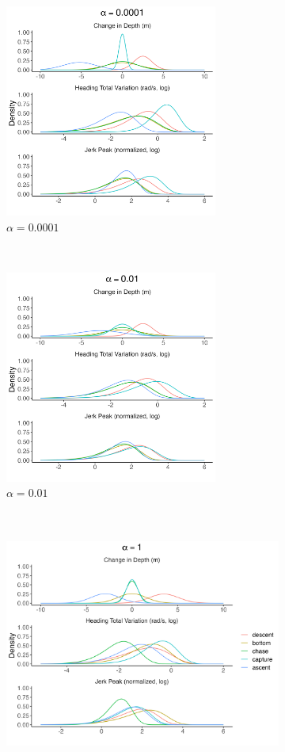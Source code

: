 \begin{figure}
    \centering
    \begin{subfigure}[t]{0.45\textwidth}
        \centering
        \includegraphics[height = 2.75in]{plt/emissions_delt_d_htv_jp_normed_-4_1.png}
        \caption{$\alpha = 0.0001$}
    \end{subfigure}
    ~
    \begin{subfigure}[t]{0.45\textwidth}
        \centering
        \includegraphics[height = 2.75in]{plt/emissions_delt_d_htv_jp_normed_-2_1.png}
        \caption{$\alpha = 0.01$}
    \end{subfigure}
    \\
    \begin{subfigure}[t]{0.9\textwidth}
        \centering
        \includegraphics[height = 2.75in]{plt/emissions_delt_d_htv_jp_normed_0_1.png}

\end{subfigure}
\end{figure}
